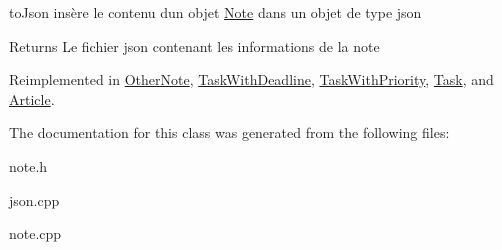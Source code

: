 to\+Json insère le contenu d\textquotesingle{}un objet \hyperlink{classNote}{Note} dans un objet de type json 

\begin{DoxyReturn}{Returns}
Le fichier json contenant les informations de la note 
\end{DoxyReturn}


Reimplemented in \hyperlink{classOtherNote_a0fb04e9da102ac17fb777f29bfc24a57}{Other\+Note}, \hyperlink{classTaskWithDeadline_a7ded765b2eb469cb31538bd52f75ae6e}{Task\+With\+Deadline}, \hyperlink{classTaskWithPriority_adeda4ce31e96224993db991c60fccbc7}{Task\+With\+Priority}, \hyperlink{classTask_af20f0085e2426cbf64955a03d8920400}{Task}, and \hyperlink{classArticle_af1ca7d2c39aae800610504319526f3e3}{Article}.



The documentation for this class was generated from the following files\+:\begin{DoxyCompactItemize}
\item 
note.\+h\item 
json.\+cpp\item 
note.\+cpp\end{DoxyCompactItemize}
